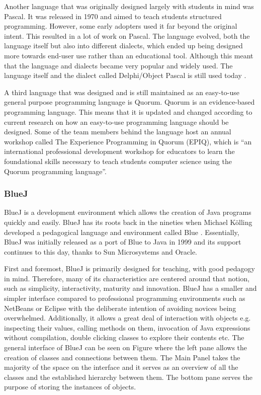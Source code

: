Another language that was originally designed largely with students in mind was Pascal. It was released in 1970 and aimed to teach students structured programming. However, some early adopters used it far beyond the original intent. This resulted in a lot of work on Pascal. The language evolved, both the language itself but also into different dialects, which ended up being designed more towards end-user use rather than an educational tool. Although this meant that the language and dialects became very popular and widely used. The language itself and the dialect called Delphi/Object Pascal is still used today \cite{tiobe}.

A third language that was designed and is still maintained as an easy-to-use general purpose programming language is Quorum. Quorum is an evidence-based programming language. This means that it is updated and changed according to current research on how an easy-to-use programming language should be designed. Some of the team members behind the language host an annual workshop called The Experience Programming in Quorum (EPIQ), which is ``an international professional development workshop for educators to learn the foundational skills necessary to teach students computer science using the Quorum programming language''\cite{quorum_epiq}.

\subsubsection{BlueJ}
BlueJ is a development environment which allows the creation of Java programs quickly and easily. BlueJ has its roots back in the nineties when Michael Kölling developed a pedagogical language and environment called Blue \cite{bluej_overview}. Essentially, BlueJ was initially released as a port of Blue to Java in 1999 and its support continues to this day, thanks to Sun Microsystems and Oracle.

First and foremost, BlueJ is primarily designed for teaching, with good pedagogy in mind. Therefore, many of its characteristics are centered around that notion, such as simplicity, interactivity, maturity and innovation. BlueJ has a smaller and simpler interface compared to professional programming environments such as NetBeans or Eclipse with the deliberate intention of avoiding novices being overwhelmed. Additionally, it allows a great deal of interaction with objects e.g. inspecting their values, calling methods on them, invocation of Java expressions without compilation, double clicking classes to explore their contents etc. The general interface of BlueJ can be seen on Figure  where the left pane allows the creation of classes and connections between them. The Main Panel takes the majority of the space on the interface and it serves as an overview of all the classes and the established hierarchy between them. The bottom pane serves the purpose of storing the instances of objects.

